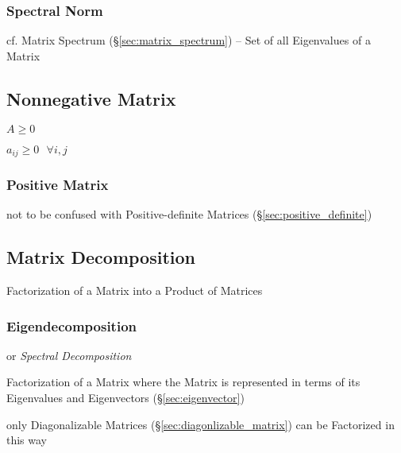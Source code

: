 \subsubsection{Spectral Norm}\label{sec:spectral_norm}

cf. Matrix Spectrum (\S\ref{sec:matrix_spectrum}) -- Set of all Eigenvalues of
a Matrix



\subsection{Nonnegative Matrix}\label{sec:nonnegative_matrix}

$A \geq 0$

$a_{ij} \geq 0 \ \ \ \forall i,j$



\subsubsection{Positive Matrix}\label{sec:positive_matrix}

\fist not to be confused with Positive-definite Matrices
(\S\ref{sec:positive_definite})



\subsection{Matrix Decomposition}\label{sec:matrix_decomposition}

Factorization of a Matrix into a Product of Matrices



\subsubsection{Eigendecomposition}\label{sec:eigendecomposition}

or \emph{Spectral Decomposition}

Factorization of a Matrix where the Matrix is represented in terms of its
Eigenvalues and Eigenvectors (\S\ref{sec:eigenvector})

only Diagonalizable Matrices (\S\ref{sec:diagonlizable_matrix}) can be
Factorized in this way



